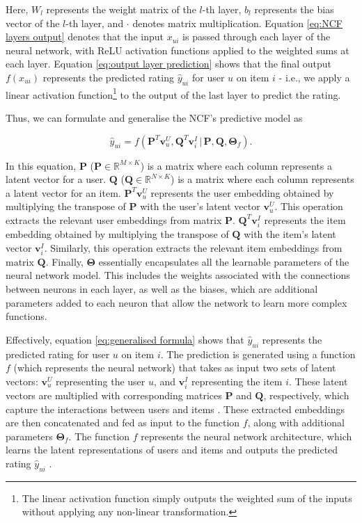 Here, $W_l$ represents the weight matrix of the $l$-th layer, $b_l$ represents the bias vector of the $l$-th layer, and $\cdot$ denotes matrix multiplication. Equation \ref{eq:NCF layers output} denotes that the input $x_{ui}$ is passed through each layer of the neural network, with ReLU activation functions applied to the weighted sums at each layer. Equation \ref{eq:output layer prediction} shows that the final output $f\left(x_{ui}\right)$ represents the predicted rating $\hat{y}_{ui}$ for user $u$ on item $i$ - i.e., we apply a linear activation function\footnote{The linear activation function simply outputs the weighted sum of the inputs without applying any non-linear transformation.} to the output of the last layer to predict the rating.


Thus, we can formulate and generalise the NCF’s predictive model as


\begin{equation}
    \label{eq:generalised formula}
    \hat{y}_{ui} = f\left(\mathbf{P}^T \mathbf{v}_u^U, \mathbf{Q}^T \mathbf{v}_i^I \,|\, \mathbf{P}, \mathbf{Q}, \boldsymbol{\Theta}_f\right).
\end{equation}
    
In this equation, $\mathbf{P}$ ($\mathbf{P} \in \mathbb{R}^{M \times K}$) is a matrix where each column represents a latent vector for a user. $\mathbf{Q}$ ($\mathbf{Q} \in \mathbb{R}^{N \times K}$) is a matrix where each column represents a latent vector for an item. $\mathbf{P}^T \mathbf{v}_u^U$ represents the user embedding obtained by multiplying the transpose of $\mathbf{P}$ with the user's latent vector $\mathbf{v}_u^U$. This operation extracts the relevant user embeddings from matrix $\mathbf{P}$.
$\mathbf{Q}^T \mathbf{v}_i^I$ represents the item embedding obtained by multiplying the transpose of $\mathbf{Q}$ with the item's latent vector $\mathbf{v}_i^I$. Similarly, this operation extracts the relevant item embeddings from matrix $\mathbf{Q}$. Finally, $\boldsymbol{\Theta}$ essentially encapsulates all the learnable parameters of the neural network model. This includes the weights associated with the connections between neurons in each layer, as well as the biases, which are additional parameters added to each neuron that allow the network to learn more complex functions. 
 
Effectively, equation \ref{eq:generalised formula} shows that $\hat{y}_{ui}$ represents the predicted rating for user $u$ on item $i$. The prediction is generated using a function $f$ (which represents the neural network) that takes as input two sets of latent vectors: $\mathbf{v}_u^U$ representing the user $u$, and $\mathbf{v}_i^I$ representing the item $i$. These latent vectors are multiplied with corresponding matrices $\mathbf{P}$ and $\mathbf{Q}$, respectively, which capture the interactions between users and items \cite{he2017neural}. These extracted embeddings are then concatenated and fed as input to the function $f$, along with additional parameters $\boldsymbol{\Theta}_f$. The function $f$ represents the neural network architecture, which learns the latent representations of users and items and outputs the predicted rating $\hat{y}_{ui}$ \cite{he2017neural}.

